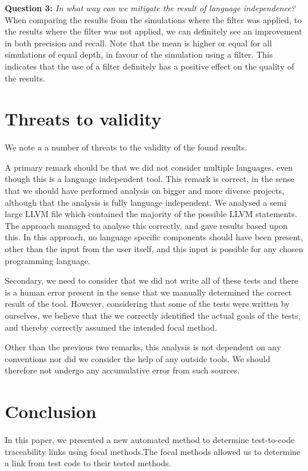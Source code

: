 \documentclass[11pt]{article}
\begin{document}
\begin{multicols}{2}
\textbf{Question 3:} \textit{In what way can we mitigate the result of language independence?}\\
When comparing the results from the simulations where the filter was applied, to the results where the filter was not applied, we can definitely see an improvement in both precision and recall. Note that the mean is higher or equal for all simulations of equal depth, in favour of the simulation using a filter. This indicates that the use of a filter definitely has a positive effect on the quality of the results.

\section{Threats to validity}
We note a a number of threats to the validity of the found results.

A primary remark should be that we did not consider multiple languages, even though this is a language independent tool. This remark is correct, in the sense that we should have performed analysis on bigger and more diverse projects, although that the analysis is fully language independent. We analysed a semi large LLVM file which contained the majority of the possible LLVM statements. The approach managed to analyse this correctly, and gave results based upon this. In this approach, no language specific components should have been present, other than the input from the user itself, and this input is possible for any chosen programming language. 

Secondary, we need to consider that we did not write all of these tests and there is a human error present in the sense that we manually determined the correct result of the tool. However, considering that some of the tests were written by ourselves, we believe that the we correctly identified the actual goals of the tests, and thereby correctly assumed the intended focal method.

Other than the previous two remarks, this analysis is not dependent on any conventions nor did we consider the help of any outside tools. We should therefore not undergo any accumulative error from such sources.

\section{Conclusion}
In this paper, we presented a new automated method to determine test-to-code traceability links using focal methods.The focal methods allowed us to determine a link from test code to their tested methods.


\end{multicols}
\end{document}
